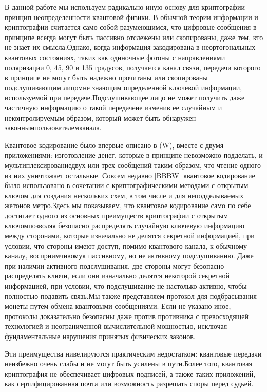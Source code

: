 ­­­­В данной работе мы используем радикально иную основу для криптографии - принцип неопределенности квантовой физики. В обычной теории информации и криптографии считается само собой разумеющимся, что цифровые сообщения в принципе всегда могут быть пассивно отслежены или скопированы, даже тем, кто не знает их смысла.Однако, когда информация закодирована в неортогональных квантовых состояниях, таких как одиночные фотоны с направлениями поляризации 0, 45, 90 и 135 градусов, получается канал связи, передачи которого в принципе не могут быть надежно прочитаны или скопированы подслушивающим лицомне знающим определенной ключевой информации, используемой при передаче.Подслушивающее лицо не может получить даже частичную информацию о такой передачене изменив ее случайным и неконтролируемым образом, который может быть обнаружен законнымпользователемканала.

­­­­­­Квантовое кодирование было впервые описано в (W), вместе с двумя приложениями: изготовление денег, которые в принципе невозможно подделать, и мультиплексированиедвух или трех сообщений таким образом, что чтение одного из них уничтожает остальные. Совсем недавно [BBBW] квантовое кодирование было использовано в сочетании с криптографическими методами с открытым ключом для создания нескольких схем, в том числе и для неподделываемых жетонов метро.Здесь мы показываем, что квантовое кодирование само по себе достигает одного из основных преимуществ криптографии с открытым ключомпозволяя безопасно распределять случайную ключевую информацию между сторонами, которые изначально не делятся секретной информацией, при условии, что стороны имеют доступ, помимо квантового канала, к обычному каналу, восприимчивомук пассивному, но не активному подслушиванию. Даже при наличии активного подслушивания, две стороны могут безопасно распределять ключи, если они изначально делятся некоторой секретной информацией, при условии, что подслушивание не настолько активно, чтобы полностью подавить связь.Мы также представляем протокол для подбрасывания монеты путем обмена квантовыми сообщениями. Если не указано иное, протоколы доказательно безопасны даже против противника с превосходящей технологией и неограниченной вычислительной мощностью, исключая фундаментальные нарушения принятых физических законов.

­­Эти преимущества нивелируются практическим недостатком: квантовые передачи неизбежно очень слабы и не могут быть усилены в пути.Более того, квантовая криптография не обеспечивает цифровых подписей, а также таких приложений, как сертифицированная почта или возможность разрешать споры перед судьей.

